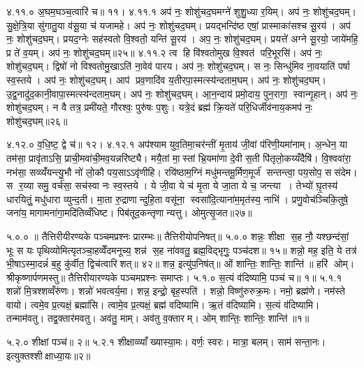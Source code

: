 ४.११.०
अ॒घम॒घञ्च॒त्वारि॑ च॥ ११।
४.११.१
अप॑ नः॒ शोशु॑चद॒घमग्ने॑ शुशु॒ध्या र॒यिम्। अप॑ नः॒ शोशु॑चद॒घम्। सु॒क्षे॒त्रि॒या सु॑गातु॒या व॑सू॒या च॑ यजामहे। अप॑ नः॒ शोशु॑चद॒घम्। प्रयद्भन्दि॑ष्ठ एषां॒ प्रास्माका॑सश्च सू॒रय॑। अप॑ नः॒ शोशु॑चद॒घम्। प्रयद॒ग्नेः सह॑स्वतो वि॒श्वतो॒ यन्ति॑ सू॒रय॑। अप॒ नः॒ शोशु॑चद॒घम्। प्रयत्ते॑ अग्ने सू॒रयो॒ जाये॑महि॒ प्र ते॑ व॒यम्। अप॑ नः॒ शोशु॑चद॒घम्॥२५॥
४.११.२
त्व हि वि॑श्वतोमुख वि॒श्वत॑ परि॒भूरसि॑। अप॑ नः॒ शोशु॑चद॒घम्। द्विषो॑ नो विश्वतोमु॒खाऽति॑ ना॒वेव॑ पारय। अप॑ नः॒ शोशु॑चद॒घम्। स नः॒ सिन्धु॑मिव ना॒वयाति॑ पर्\mbox{}षा स्व॒स्तये। अप॑ नः॒ शोशु॑चद॒घम्। आप॑ प्रव॒णादि॑व य॒तीरपा॒स्मत्स्य॑न्दताम॒घम्। अप॑ नः॒ शोशु॑चद॒घम्। उ॒द्व॒नादु॑द॒कानी॒वापा॒स्मत्स्य॑न्दताम॒घम्। अप॑ नः॒ शोशु॑चद॒घम्। आ॒न॒न्दाय॑ प्रमो॒दाय॒ पुन॒रागा॒ स्वान्गृ॒हान्। अप॑ नः॒ शोशु॑चद॒घम्। न वै तत्र॒ प्रमी॑यते॒ गौरश्वः॒ पुरु॑षः प॒शुः। यत्रे॒दं ब्रह्म॑ क्रि॒यते॑ परि॒धिर्जीव॑नाय॒कमप॑ नः॒ शोशु॑चद॒घम्॥२६॥
\anuvakamend

४.१२.०
व॒धि॒ष्ट॒ द्वे च॑॥ १२।
४.१२.१
अप॑श्याम युव॒तिमा॒चर॑न्तीं मृ॒ताय॑ जी॒वां प॑रिणी॒यमा॑नाम्। अ॒न्धेन॒ या तम॑सा॒ प्रावृ॑ताऽसि॒ प्राची॒मवा॑ची॒मव॒यन्नरि॑ष्ट्यै। मयै॒तां मा॒स्तां भ्रि॒यमा॑णा दे॒वी स॒ती पि॑तृलो॒कय्यँदैषि॑। वि॒श्ववा॑रा॒ नभ॑सा॒ सव्व्यँ॑यन्त्यु॒भौ नो॑ लो॒कौ पय॒साऽऽवृ॑णीहि। रयि॑ष्ठाम॒ग्निं मधु॑मन्तमू॒र्मिण॒मूर्ज॑ सन्तन्त्वा॒ पय॒सोप॒ सस॑देम। स र॒य्या समु॒ वर्च॑सा॒ सच॑स्वा नः स्व॒स्तये। ये जी॒वा ये च॑ मृ॒ता ये जा॒ता ये च॒ जन्त्या। तेभ्यो॑ घ़ृ॒तस्य॑ धारयितुं॒ मधु॑धारा व्युन्द॒ती। मा॒ता रु॒द्राणान्दुहि॒ता वसू॑ना॒ स्वसा॑दि॒त्याना॑म॒मृत॑स्य॒ नाभि॑। प्रणु॒वोच॑ञ्चिकि॒तुषे॒ जना॑य॒ मागामना॑गा॒मदि॑तिव्वँधिष्ट। पिब॑तूद॒कन्तृणान्यत्तु। ओमुत्सृ॒जत॥२७॥

\setcounter{anuvakam}{0}
५.०.०
॥ तैत्तिरीयीरण्यके पञ्चमप्रश्नः प्रारम्भः॥ तैत्तिरीयोपनिषत्॥
५.०.०
शन्नः॒ शीक्षा स॒ह नौ॒ यश्छन्द॑सां॒ भूः स यः पृथिव्योमित्यृतञ्चा॒हव्वेँदमनूच्य॒ शन्न॑ स॒ह ना॑ववतु॒ ब्रह्म॒विद्भृगुः॒ पञ्च॑दश॥ १५॥ शन्नो॒ मह॒ इति॒ ये तत्र॑ भी॒षाऽस्मा॒दन्नं॑ ब॒हु कु॑र्वीत॒ द्विच॑त्वारिशत्॥ ४२॥ शन्न॒ इत्यु॑प॒निष॑त्॥ ओं शान्तिः॒ शान्तिः॒ शान्ति॑॥ हरि॑ ओम्। श्रीकृष्णार्पणमस्तु॥ तैत्तिरीयारण्यके पञ्चमप्रश्नः समाप्तः।
५.१.०
स॒त्यं व॑दिष्यामि॒ पञ्च॑ च॥ १॥
५.१.१
शन्नो॑ मि॒त्रश्शव्वँरु॑णः। शन्नो॑ भवत्वर्य॒मा। शन्न॒ इन्द्रो॒ बृह॒स्पति॑। शन्नो॒ विष्णु॑रुरुक्र॒मः। नमो॒ ब्रह्म॑णे। नम॑स्ते वायो। त्वमे॒व प्र॒त्यक्षं॒ ब्रह्मा॑सि। त्वामे॒व प्र॒त्यक्षं॒ ब्रह्म॑ वदिष्यामि। ऋ॒तं व॑दिष्यामि। स॒त्यं व॑दिष्यामि। तन्माम॑वतु। तद्व॒क्तार॑मवतु। अव॑तु॒ माम्। अव॑तु व॒क्तारम्। ओम् शान्तिः॒ शान्तिः॒ शान्ति॑॥१॥
\anuvakamend

५.२.०
शीक्षां पञ्च॑॥ २॥
५.२.१
शीक्षाव्व्याँख्यास्या॒मः। वर्णः॒ स्वरः। मात्रा॒ बलम्। साम॑ सन्ता॒नः। इत्युक्तश्शीक्षाध्या॒यः॥२॥
\anuvakamend

